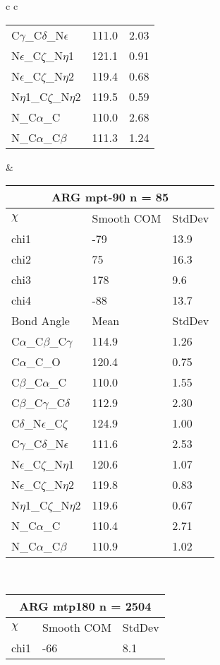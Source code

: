 \begin{longtable}{ c c }
\begin{tabular}{ l l l }
  C$\gamma$\_C$\delta$\_N$\epsilon$ & 111.0 & 2.03\\
  N$\epsilon$\_C$\zeta$\_N$\eta$1 & 121.1 & 0.91\\
  N$\epsilon$\_C$\zeta$\_N$\eta$2 & 119.4 & 0.68\\
  N$\eta$1\_C$\zeta$\_N$\eta$2 & 119.5 & 0.59\\
  N\_C$\alpha$\_C & 110.0 & 2.68\\
  N\_C$\alpha$\_C$\beta$ & 111.3 & 1.24\\
  \bottomrule
  \end{tabular}
  &
  \begin{tabular}{ l l l }
  \toprule
  \multicolumn{3}{c}{ARG \textbf{mpt-90} n = 85} \\ \toprule
  $\chi$       & Smooth COM & StdDev \\ \midrule
  chi1 & -79 & 13.9 \\ 
  chi2 & 75 & 16.3 \\ 
  chi3 & 178 & 9.6 \\ 
  chi4 & -88 & 13.7 \\ \midrule
  Bond Angle   & Mean     & StdDev \\ \midrule
  C$\alpha$\_C$\beta$\_C$\gamma$ & 114.9 & 1.26\\
  C$\alpha$\_C\_O & 120.4 & 0.75\\
  C$\beta$\_C$\alpha$\_C & 110.0 & 1.55\\
  C$\beta$\_C$\gamma$\_C$\delta$ & 112.9 & 2.30\\
  C$\delta$\_N$\epsilon$\_C$\zeta$ & 124.9 & 1.00\\
  C$\gamma$\_C$\delta$\_N$\epsilon$ & 111.6 & 2.53\\
  N$\epsilon$\_C$\zeta$\_N$\eta$1 & 120.6 & 1.07\\
  N$\epsilon$\_C$\zeta$\_N$\eta$2 & 119.8 & 0.83\\
  N$\eta$1\_C$\zeta$\_N$\eta$2 & 119.6 & 0.67\\
  N\_C$\alpha$\_C & 110.4 & 2.71\\
  N\_C$\alpha$\_C$\beta$ & 110.9 & 1.02\\
  \bottomrule
  \end{tabular}
  \\
  \begin{tabular}{ l l l }
  \toprule
  \multicolumn{3}{c}{ARG \textbf{mtp180} n = 2504} \\ \toprule
  $\chi$       & Smooth COM & StdDev \\ \midrule
  chi1 & -66 & 8.1 \\ 

\end{tabular}
\end{longtable}
